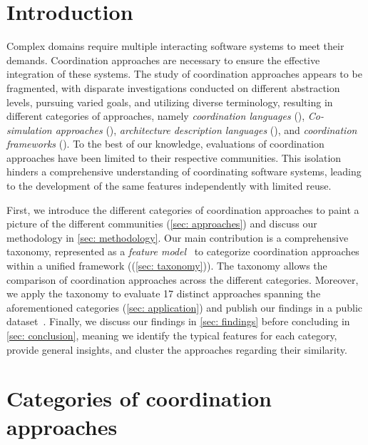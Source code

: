 \documentclass[runningheads]{llncs}
\begin{document}
\section{Introduction} \label{sec: introduction}
Complex domains require multiple interacting software systems to meet their demands. 
Coordination approaches are necessary to ensure the effective integration of these systems.
The study of coordination approaches appears to be fragmented, with disparate investigations conducted on different abstraction levels, pursuing varied goals, and utilizing diverse terminology, resulting in different categories of approaches, namely \textit{coordination languages} (\cite{papadopoulosCoordinationModelsLanguages1998}), \textit{Co-simulation approaches} (\cite{gomesCoSimulationSurvey2019}), \textit{architecture description languages} (\cite{clementsSurveyArchitectureDescription1996}), and \textit{coordination frameworks} (\cite{krauterBehavioralConsistencyMultimodeling2023,varalarsenBehavioralCoordinationOperator2015}).
To the best of our knowledge, evaluations of coordination approaches have been limited to their respective communities.
This isolation hinders a comprehensive understanding of coordinating software systems, leading to the development of the same features independently with limited reuse.

First, we introduce the different categories of coordination approaches to paint a picture of the different communities (\autoref{sec: approaches}) and discuss our methodology in \autoref{sec: methodology}.
Our main contribution is a comprehensive taxonomy, represented as a \textit{feature model}~\cite{kangFeatureOrientedDomainAnalysis1990} to categorize coordination approaches within a unified framework ((\autoref{sec: taxonomy})).
The taxonomy allows the comparison of coordination approaches across the different categories.
Moreover, we apply the taxonomy to evaluate 17 distinct approaches spanning the aforementioned categories (\autoref{sec: application}) and publish our findings in a public dataset~\cite{timkrauterArtifactsCoordination2024}.
Finally, we discuss our findings in \autoref{sec: findings} before concluding in \autoref{sec: conclusion}, meaning we identify the typical features for each category, provide general insights, and cluster the approaches regarding their similarity.

\section{Categories of coordination approaches} \label{sec: approaches}
\end{document}
